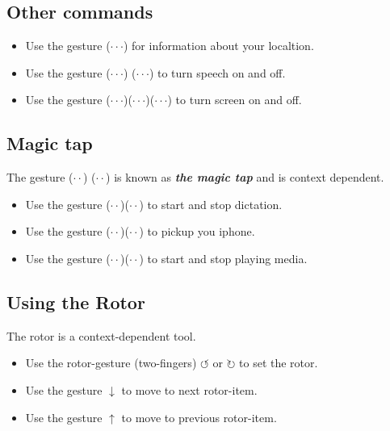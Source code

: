 \documentclass[a4paper, landscape, 10pt]{scrartcl}
\begin{document}
\begin{multicols}{2}
\subsection*{Other commands}
\begin{itemize}
\item{ Use the gesture ($\cdot\cdot\cdot$) for information about your localtion.}
\item{ Use the gesture ($\cdot\cdot\cdot$) ($\cdot\cdot\cdot$) to turn speech on and off.}
\item{ Use the gesture ($\cdot\cdot\cdot$)($\cdot\cdot\cdot$)($\cdot\cdot\cdot$) to turn screen on and off.}
\end{itemize}

\subsection*{Magic tap}
The gesture  ($\cdot\cdot$) ($\cdot\cdot$) is known as \textbf{\textit{the magic tap}} and is context dependent.
\begin{itemize}
\item{ Use the gesture ($\cdot\cdot$)($\cdot\cdot$)  to start and stop dictation.}
\item{ Use the gesture ($\cdot\cdot$)($\cdot\cdot$) to pickup you iphone.}
\item{ Use the gesture ($\cdot\cdot$)($\cdot\cdot$) to start and stop playing media.}
\end{itemize}

\subsection*{Using the Rotor}
The rotor is a context-dependent tool. 
\begin{itemize}
\item{Use the rotor-gesture (two-fingers) $\circlearrowleft{}$ or $\circlearrowright$ to set the rotor.}
\item{Use the gesture $\downarrow$ to move to next rotor-item.}
\item{Use the gesture $\uparrow$ to move to previous rotor-item.}
\end{itemize}

\end{multicols}

\hrulefill{}
\end{document}
